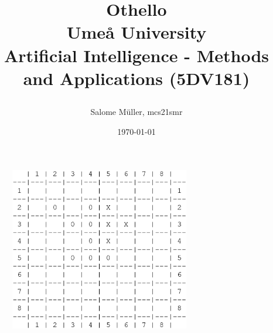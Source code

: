 \documentclass[10pt]{article}
\title{
    Othello \\
    \vspace{3em}
    {\large Umeå University \\
    Artificial Intelligence - Methods and Applications (5DV181)}
    \vspace{3em}
    
}
\author{Salome Müller, mcs21smr}
\date{\today}
\begin{document}
\maketitle

\vspace{1em}

\begin{figure}[h]
    \centering
    \includegraphics[width=0.7\textwidth]{position1.png}
\end{figure}

\pagebreak





\end{document}
